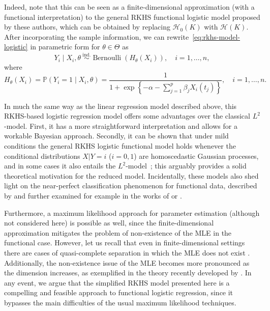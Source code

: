 \documentclass{article}
\numberwithin{equation}{section}
\theoremstyle{plain}
\theoremstyle{definition}
\newcommand{\Hcal}{\mathcal{H}}
\begin{document}
Indeed, note that this can be seen as a finite-dimensional approximation (with a functional interpretation) to the general RKHS functional logistic model proposed by these authors, which can be obtained by replacing \(\Hcal_{0}(K)\) with \(\Hcal(K)\). After incorporating the sample information, we can rewrite~\eqref{eq:rkhs-model-logistic} in parametric form for \(\theta\in\Theta\) as
\begin{equation}\label{eq:rkhs-model-logistic-2}
  Y_i \mid X_i,\theta \ \stackrel{\text{ind.}}{\sim} \operatorname{Bernoulli}(H_\theta(X_i)), \quad i=1,\dots, n,
\end{equation}
where
\[
  H_\theta(X_i) = \mathbb P(Y_i=1 \mid X_i,\theta) = \frac{1}{\displaystyle 1 + \exp\left\{-\alpha - \sum_{j=1}^p \beta_j X_i(t_j)\right\}}, \quad i=1,\dots, n.
\]

In much the same way as the linear regression model described above, this RKHS-based logistic regression model offers some advantages over the classical \(L^2\)-model. First, it has a more straightforward interpretation and allows for a workable Bayesian approach. Secondly, it can be shown that under mild conditions the general RKHS logistic functional model holds whenever the conditional distributions \(X | Y=i\) (\(i=0,1\)) are homoscedastic Gaussian processes, and in some cases it also entails the \(L^2\)-model~\citep[see][]{berrendero2023functional}; this arguably provides a solid theoretical motivation for the reduced model. Incidentally, these models also shed light on the near-perfect classification phenomenon for functional data, described by \citet{delaigle2012achieving} and further examined for example in the works of \citet{berrendero2018use} or \citet{torrecilla2020optimal}.

Furthermore, a maximum likelihood approach for parameter estimation (although not considered here) is possible as well, since the finite-dimensional approximation  mitigates the problem of non-existence of the MLE in the functional case. However, let us recall that even in finite-dimensional settings there are cases of quasi-complete separation in which the MLE does not exist \citep{albert1984existence}. Additionally, the non-existence issue of the MLE becomes more pronounced as the dimension increases, as exemplified in the theory recently developed by \citet{candes2020phase}. In any event, we argue that the simplified RKHS model presented here is a compelling and feasible approach to functional logistic regression, since it bypasses the main difficulties of the usual maximum likelihood techniques.
\end{document}
